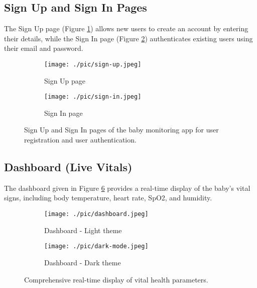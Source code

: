 \documentclass[12pt,a4paper]{report}
\begin{document}
\subsection{Sign Up and Sign In Pages}
The Sign Up page (Figure \ref{fig:sign-up}) allows new users to create an account by entering their details, while the Sign In page (Figure \ref{fig:sign-in}) authenticates existing users using their email and password.
\begin{figure}[H]
  \centering
  \begin{subfigure}[b]{0.22\textwidth}
    \centering
    \texttt{[image: ./pic/sign-up.jpeg]}
    \caption{Sign Up page}
    \label{fig:sign-up}
\end{subfigure}
  \hspace{0.1\textwidth}
  \begin{subfigure}[b]{0.22\textwidth} %
      \centering
      \texttt{[image: ./pic/sign-in.jpeg]}
      \caption{Sign In page}
      \label{fig:sign-in}
  \end{subfigure}
  
  
  \caption{Sign Up and Sign In pages of the baby monitoring app for user registration and user authentication.}
    \label{fig:auth-pages}
\end{figure}
\subsection{Dashboard (Live Vitals)}
The dashboard given in Figure \ref{fig:dashboard} provides a real-time display of the baby's vital signs, including body temperature, heart rate, SpO2, and humidity. 

\begin{figure}[H]
  \centering
  \begin{subfigure}[b]{0.22\textwidth}
    \centering
    \texttt{[image: ./pic/dashboard.jpeg]}
    \caption{Dashboard - Light theme}
    \label{fig:dashboard-light}
\end{subfigure}
  \hspace{0.1\textwidth}
  \begin{subfigure}[b]{0.22\textwidth} %
      \centering
      \texttt{[image: ./pic/dark-mode.jpeg]}
      \caption{Dashboard - Dark theme}
      \label{fig:dashboard-dark}
  \end{subfigure}
  
  
  \caption{Comprehensive real-time display of vital health parameters.}
    \label{fig:dashboard}
\end{figure}
\end{document}
